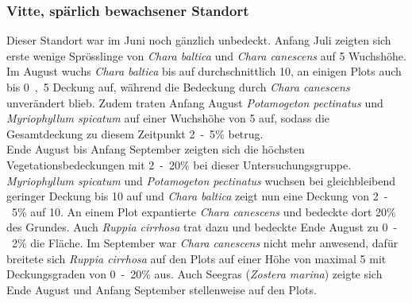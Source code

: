\subsubsection{Vitte, spärlich bewachsener Standort}


Dieser Standort war im Juni noch gänzlich unbedeckt. Anfang Juli zeigten sich erste wenige Sprösslinge von \textit{Chara baltica} und \textit{Chara canescens} auf \unit{5}{\centi\metre} Wuchshöhe. Im August wuchs \textit{Chara baltica} bis auf durchschnittlich \unit{10}{\centi\metre}, an einigen Plots auch bis \unit{0,5}{\centi\metre} Deckung auf, während die Bedeckung durch \textit{Chara canescens} unverändert blieb. Zudem traten Anfang August \textit{Potamogeton pectinatus} und \textit{Myriophyllum spicatum} auf einer Wuchshöhe von \unit{5}{\centi\metre} auf, sodass die Gesamtdeckung zu diesem Zeitpunkt \unit{2-5}{\%} betrug. \\
Ende August bis Anfang September zeigten sich die höchsten Vegetationsbedeckungen mit \unit{2-20}{\%} bei dieser Untersuchungsgruppe. \textit{Myriophyllum spicatum} und \textit{Potamogeton pectinatus} wuchsen bei gleichbleibend geringer Deckung bis \unit{10}{\centi\metre} auf und \textit{Chara baltica} zeigt nun eine Deckung von \unit{2-5}{\%} auf \unit{10}{\centi\metre}. An einem Plot expantierte \textit{Chara canescens} und bedeckte dort \unit{20}{\%} des Grundes. Auch \textit{Ruppia cirrhosa} trat dazu und bedeckte Ende August zu \unit{0-2}{\%} die Fläche. Im September war \textit{Chara canescens} nicht mehr anwesend, dafür breitete sich \textit{Ruppia cirrhosa} auf den Plots auf einer Höhe von maximal \unit{5}{\centi\metre} mit Deckungsgraden von \unit{0-20}{\%} aus. Auch Seegras (\textit{Zostera marina}) zeigte sich Ende August und Anfang September stellenweise auf den Plots.

